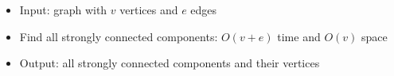 \begin{itemize}
	\item Input: graph with $v$ vertices and $e$ edges
	\item Find all strongly connected components: $O(v+e)$ time and $O(v)$ space
	\item Output: all strongly connected components and their vertices
\end{itemize}